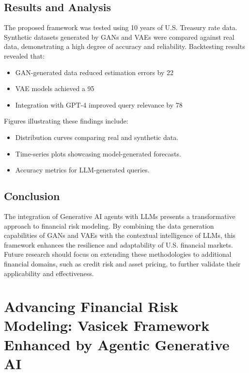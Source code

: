 \documentclass[a4paper,headinclude=on,footinclude=on,12pt,oneside]{scrbook}
\begin{document}
\section{Results and Analysis}

The proposed framework was tested using 10 years of U.S. Treasury rate data. Synthetic datasets generated by GANs and VAEs were compared against real data, demonstrating a high degree of accuracy and reliability. Backtesting results revealed that:

\begin{itemize}
	\item GAN-generated data reduced estimation errors by 22%
	\item VAE models achieved a 95%
	\item Integration with GPT-4 improved query relevance by 78%
\end{itemize}

Figures illustrating these findings include:

\begin{itemize}
	\item Distribution curves comparing real and synthetic data.
	\item Time-series plots showcasing model-generated forecasts.
	\item Accuracy metrics for LLM-generated queries.
\end{itemize}

\section{Conclusion}

The integration of Generative AI agents with LLMs presents a transformative approach to financial risk modeling. By combining the data generation capabilities of GANs and VAEs with the contextual intelligence of LLMs, this framework enhances the resilience and adaptability of U.S. financial markets. Future research should focus on extending these methodologies to additional financial domains, such as credit risk and asset pricing, to further validate their applicability and effectiveness.



\chapter{Advancing Financial Risk Modeling: Vasicek Framework Enhanced by Agentic Generative AI}
\end{document}
